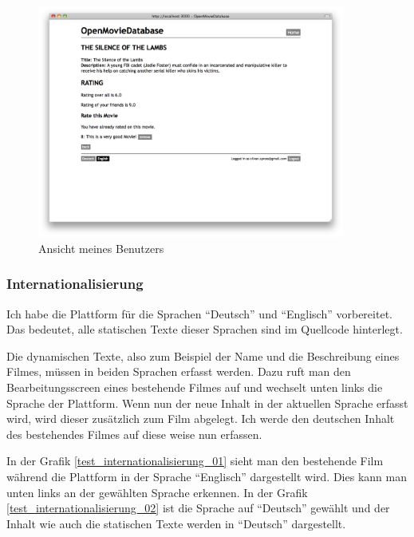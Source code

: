 \begin{figure}[ht]
    \begin{center}
        \includegraphics[width=0.9\textwidth,angle=0]{./bilder/tests/test_bewertung_05.png}
        \caption{Ansicht meines Benutzers}
        \label{test_bewertung_05}
    \end{center}
\end{figure}

\clearpage

\subsubsection{Internationalisierung}
Ich habe die Plattform für die Sprachen ``Deutsch'' und ``Englisch'' vorbereitet.
Das bedeutet, alle statischen Texte dieser Sprachen sind im Quellcode hinterlegt.

Die dynamischen Texte, also zum Beispiel der Name und die Beschreibung eines
Filmes, müssen in beiden Sprachen erfasst werden. Dazu ruft man den Bearbeitungsscreen
eines bestehende Filmes auf und wechselt unten links die Sprache der Plattform.
Wenn nun der neue Inhalt in der aktuellen Sprache erfasst wird, wird dieser 
zusätzlich zum Film abgelegt. Ich werde den deutschen Inhalt des bestehendes Filmes 
auf diese weise nun erfassen.

In der Grafik \ref{test_internationalisierung_01} sieht man den bestehende Film
während die Plattform in der Sprache ``Englisch'' dargestellt wird. Dies kann man
unten links an der gewählten Sprache erkennen. In der Grafik \ref{test_internationalisierung_02}
ist die Sprache auf ``Deutsch'' gewählt und der Inhalt wie auch die statischen 
Texte werden in ``Deutsch'' dargestellt.

